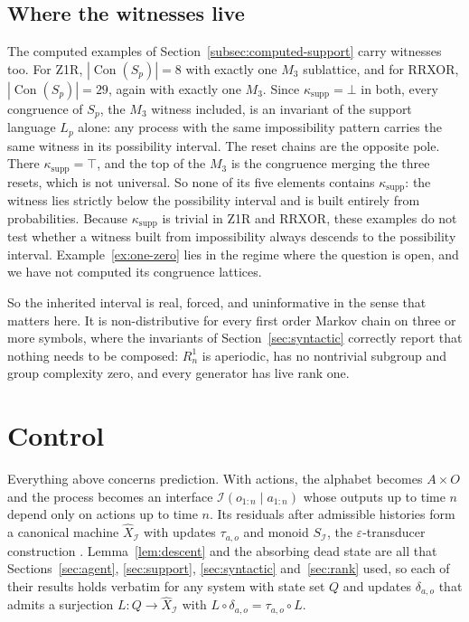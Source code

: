 \documentclass[10pt]{article}
\theoremstyle{definition}
\theoremstyle{remark}
\newcommand{\Con}{\operatorname{Con}}
\begin{document}
\subsection{Where the witnesses live}
\label{subsec:witnesses}

The computed examples of Section~\ref{subsec:computed-support} carry
witnesses too.  For Z1R, $|\Con(S_p)|=8$ with exactly one $M_3$
sublattice, and for RRXOR, $|\Con(S_p)|=29$, again with exactly one
$M_3$.  Since $\kappa_{\mathrm{supp}}=\bot$ in both, every congruence
of $S_p$, the $M_3$ witness included, is an invariant of the support
language $L_p$ alone: any process with the same impossibility pattern
carries the same witness in its possibility interval.  The reset
chains are the opposite pole.  There $\kappa_{\mathrm{supp}}=\top$,
and the top of the $M_3$ is the congruence merging the three resets,
which is not universal.  So none of its five elements contains
$\kappa_{\mathrm{supp}}$: the witness lies strictly below the
possibility interval and is built entirely from probabilities.  Because $\kappa_{\mathrm{supp}}$ is trivial in Z1R and
RRXOR, these examples do not test whether a witness built from
impossibility always descends to the possibility interval.
Example~\ref{ex:one-zero} lies in the regime where the question is
open, and we have not computed its congruence lattices.

So the inherited interval is real, forced, and uninformative in the
sense that matters here.  It is non-distributive for every first
order Markov chain on three or more symbols, where the invariants of
Section~\ref{sec:syntactic} correctly report that nothing needs to be
composed: $R_n^1$ is aperiodic, has no nontrivial subgroup and group
complexity zero, and every generator has live rank one.

\section{Control}
\label{sec:controllers}

Everything above concerns prediction.  With actions, the alphabet
becomes $A\times O$ and the process becomes an interface
$\mathcal I(o_{1:n}\mid a_{1:n})$ whose outputs up to time $n$ depend
only on actions up to time $n$.  Its residuals after admissible
histories form a canonical machine $\widehat X_{\mathcal I}$ with
updates $\tau_{a,o}$ and monoid $S_{\mathcal I}$, the
$\varepsilon$-transducer construction \cite{BarnettCrutchfield2015}.
Lemma~\ref{lem:descent} and the absorbing dead state are all that
Sections~\ref{sec:agent}, \ref{sec:support}, \ref{sec:syntactic}
and~\ref{sec:rank} used, so each of their results holds verbatim for
any system with state set $Q$ and updates $\delta_{a,o}$ that admits
a surjection $L:Q\to\widehat X_{\mathcal I}$ with
$L\circ\delta_{a,o}=\tau_{a,o}\circ L$.
\end{document}

